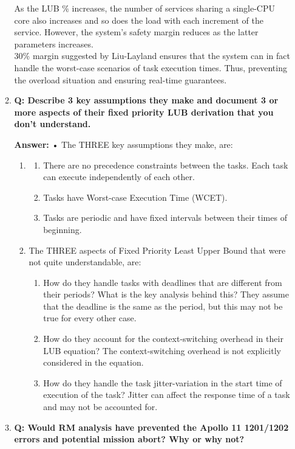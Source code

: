 \documentclass[a4paper,11pt]{article}%
\newenvironment{qanda}{\setlength{\parindent}{0pt}}{\bigskip}
\newcommand{\Q}{\bigskip\bfseries Q: }
\newcommand{\A}{\par\textbf{Answer: } \normalfont}
\begin{document}
\begin{qanda}
\begin{enumerate}
\begin{enumerate}
				      As the LUB \(\%\) increases, the number of services sharing a single-CPU core also increases and so does the load with each increment of the service. However, the system’s safety margin reduces as the latter parameters increases.\\
				      30\% margin suggested by Liu-Layland ensures that the system can in fact handle the worst-case scenarios of task execution times. Thus, preventing the overload situation and ensuring real-time guarantees.

				\item \Q Describe 3 key assumptions they make and document 3 or more aspects of their fixed priority LUB derivation that you don’t understand.

				      \A
					  • The THREE key assumptions they make, are:
					  \begin{enumerate}
						\item
						\begin{enumerate}
							\item There are no precedence constraints between the tasks. Each task can execute independently of each other.
							\item Tasks have Worst-case Execution Time (WCET).
							\item Tasks are periodic and have fixed intervals between their times of beginning.
						\end{enumerate}
						\item The THREE aspects of Fixed Priority Least Upper Bound that were not quite understandable, are:
						\begin{enumerate}
							\item How do they handle tasks with deadlines that are different from their periods? What is the key analysis behind this? They assume that the deadline is the same as the period, but this may not be true for every other case.
							\item How do they account for the context-switching overhead in their LUB equation? The context-switching overhead is not explicitly considered in the equation.
							\item How do they handle the task jitter-variation in the start time of execution of the task? Jitter can affect the response time of a task and may not be accounted for.
						\end{enumerate}
					  \end{enumerate}
				
				\item \Q Would RM analysis have prevented the Apollo 11 1201/1202 errors and potential mission abort? Why or why not?


\end{enumerate}
\end{enumerate}
\end{qanda}
\end{document}
